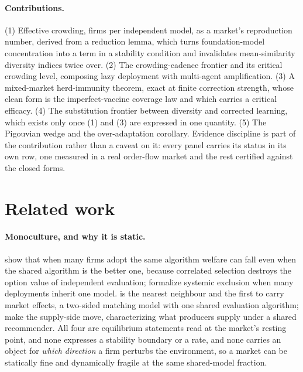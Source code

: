 \documentclass{article}
\theoremstyle{plain}
\theoremstyle{definition}
\begin{document}
\paragraph{Contributions.}
(1) Effective crowding, firms per independent model, as a market's reproduction number, derived from a reduction lemma, which turns foundation-model concentration into a term in a stability condition and invalidates mean-similarity diversity indices twice over. (2) The crowding-cadence frontier and its critical crowding level, composing lazy deployment with multi-agent amplification. (3) A mixed-market herd-immunity theorem, exact at finite correction strength, whose clean form is the imperfect-vaccine coverage law and which carries a critical efficacy. (4) The substitution frontier between diversity and corrected learning, which exists only once (1) and (3) are expressed in one quantity. (5) The Pigouvian wedge and the over-adaptation corollary. Evidence discipline is part of the contribution rather than a caveat on it: every panel carries its status in its own row, one measured in a real order-flow market and the rest certified against the closed forms.

\section{Related work}

\paragraph{Monoculture, and why it is static.}
\citet{kleinberg2021} show that when many firms adopt the same algorithm welfare can fall even when the shared algorithm is the better one, because correlated selection destroys the option value of independent evaluation; \citet{bommasani2022} formalize systemic exclusion when many deployments inherit one model. \citet{peng2024} is the nearest neighbour and the first to carry market effects, a two-sided matching model with one shared evaluation algorithm; \citet{jagadeesan2023} make the supply-side move, characterizing what producers supply under a shared recommender. All four are equilibrium statements read at the market's resting point, and none expresses a stability boundary or a rate, and none carries an object for \emph{which direction} a firm perturbs the environment, so a market can be statically fine and dynamically fragile at the same shared-model fraction.
\end{document}
